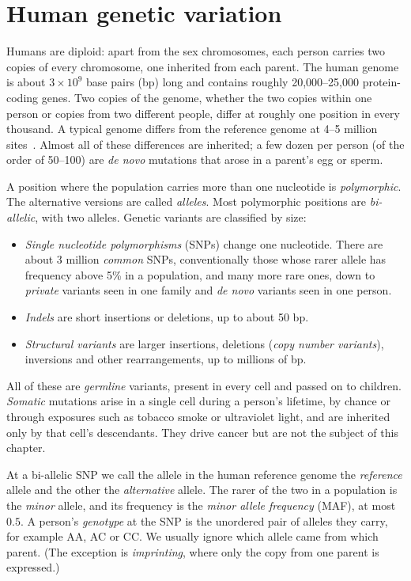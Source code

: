 \section{Human genetic variation}
\label{sec:variation}

Humans are diploid: apart from the sex chromosomes, each person carries two copies of every chromosome, one inherited from each parent. The human genome is about $3\times10^9$ base pairs (bp) long and contains roughly 20{,}000--25{,}000 protein-coding genes. Two copies of the genome, whether the two copies within one person or copies from two different people, differ at roughly one position in every thousand. A typical genome differs from the reference genome at 4--5 million sites~\citep{kg2015}. Almost all of these differences are inherited; a few dozen per person (of the order of 50--100) are \emph{de novo} mutations that arose in a parent's egg or sperm.

A position where the population carries more than one nucleotide is \emph{polymorphic}. The alternative versions are called \emph{alleles}. Most polymorphic positions are \emph{bi-allelic}, with two alleles. Genetic variants are classified by size:
\begin{itemize}
  \item \emph{Single nucleotide polymorphisms} (SNPs) change one nucleotide. There are about 3 million \emph{common} SNPs, conventionally those whose rarer allele has frequency above 5\% in a population, and many more rare ones, down to \emph{private} variants seen in one family and \emph{de novo} variants seen in one person.
  \item \emph{Indels} are short insertions or deletions, up to about 50 bp.
  \item \emph{Structural variants} are larger insertions, deletions (\emph{copy number variants}), inversions and other rearrangements, up to millions of bp.
\end{itemize}
All of these are \emph{germline} variants, present in every cell and passed on to children. \emph{Somatic} mutations arise in a single cell during a person's lifetime, by chance or through exposures such as tobacco smoke or ultraviolet light, and are inherited only by that cell's descendants. They drive cancer but are not the subject of this chapter.

At a bi-allelic SNP we call the allele in the human reference genome the \emph{reference} allele and the other the \emph{alternative} allele. The rarer of the two in a population is the \emph{minor} allele, and its frequency is the \emph{minor allele frequency} (MAF), at most $0.5$. A person's \emph{genotype} at the SNP is the unordered pair of alleles they carry, for example AA, AC or CC. We usually ignore which allele came from which parent. (The exception is \emph{imprinting}, where only the copy from one parent is expressed.)

